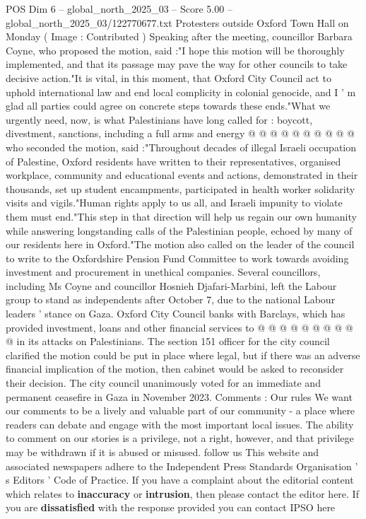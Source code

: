 \begin{textsample}{POS Dim 6 – global\_north\_2025\_03 – Score 5.00 – global\_north\_2025\_03/122770677.txt}
Protesters outside Oxford Town Hall on Monday ( Image : Contributed ) Speaking after the meeting, councillor Barbara Coyne, who proposed the motion, said :"I hope this motion will be thoroughly implemented, and that its passage may pave the way for other councils to take decisive action."It is vital, in this moment, that Oxford City Council act to uphold international law and end local complicity in colonial genocide, and I ' m glad all parties could agree on concrete steps towards these ends."What we urgently need, now, is what Palestinians have long called for : boycott, divestment, sanctions, including a full arms and energy @ @ @ @ @ @ @ @ @ @ who seconded the motion, said :"Throughout decades of illegal Israeli occupation of Palestine, Oxford residents have written to their representatives, organised workplace, community and educational events and actions, demonstrated in their thousands, set up student encampments, participated in health worker solidarity visits and vigils."Human rights apply to us all, and Israeli impunity to violate them must end."This step in that direction will help us regain our own humanity while answering longstanding calls of the Palestinian people, echoed by many of our residents here in Oxford."The motion also called on the leader of the council to write to the Oxfordshire Pension Fund Committee to work towards avoiding investment and procurement in unethical companies.
Several councillors, including Ms Coyne and councillor Hosnieh Djafari-Marbini, left the Labour group to stand as independents after October 7, due to the national Labour leaders ' stance on Gaza.
Oxford City Council banks with Barclays, which has provided investment, loans and other financial services to @ @ @ @ @ @ @ @ @ @ in its attacks on Palestinians.
The section 151 officer for the city council clarified the motion could be put in place where legal, but if there was an adverse financial implication of the motion, then cabinet would be asked to reconsider their decision.
The city council unanimously voted for an immediate and permanent ceasefire in Gaza in November 2023.
Comments : Our rules We want our comments to be a lively and valuable part of our community - a place where readers can debate and engage with the most important local issues.
The ability to comment on our stories is a privilege, not a right, however, and that privilege may be withdrawn if it is abused or misused. follow us This website and associated newspapers adhere to the Independent Press Standards Organisation ' s Editors ' Code of Practice.
If you have a complaint about the editorial content which relates to \textbf{inaccuracy} or \textbf{intrusion}, then please contact the editor here.
If you are \textbf{dissatisfied} with the response provided you can contact IPSO here

\end{textsample}
